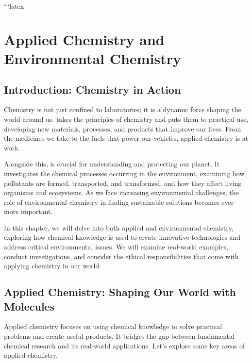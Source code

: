```latex
\chapter{Applied Chemistry and Environmental Chemistry}

\section{Introduction: Chemistry in Action}

Chemistry is not just confined to laboratories; it is a dynamic force shaping the world around us.  takes the principles of chemistry and puts them to practical use, developing new materials, processes, and products that improve our lives.  From the medicines we take to the fuels that power our vehicles, applied chemistry is at work.

Alongside this,  is crucial for understanding and protecting our planet.  It investigates the chemical processes occurring in the environment, examining how pollutants are formed, transported, and transformed, and how they affect living organisms and ecosystems.  As we face increasing environmental challenges, the role of environmental chemistry in finding sustainable solutions becomes ever more important.

In this chapter, we will delve into both applied and environmental chemistry, exploring how chemical knowledge is used to create innovative technologies and address critical environmental issues. We will examine real-world examples, conduct investigations, and consider the ethical responsibilities that come with applying chemistry in our world.

\section{Applied Chemistry: Shaping Our World with Molecules}

Applied chemistry focuses on using chemical knowledge to solve practical problems and create useful products.  It bridges the gap between fundamental chemical research and its real-world applications. Let's explore some key areas of applied chemistry.

